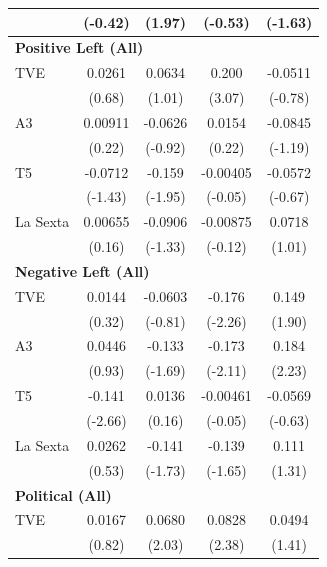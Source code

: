 \documentclass[12pt]{article}
\begin{document}
\begin{table}[htbp]
\begin{tabular}{lcccc}
		& (-0.42)          &  (1.97)          & (-0.53)         & (-1.63)         \\
		\hline
		\multicolumn{5}{l}{\textbf{Positive Left (All)}}\\
				\hline
		TVE            &  0.0261         &  0.0634         &  0.200\sym{**}  & -0.0511         \\
		&  (0.68)         &  (1.01)         &  (3.07)         & (-0.78)         \\
		A3             &  0.00911        & -0.0626         &  0.0154         & -0.0845         \\
		&  (0.22)         & (-0.92)         &  (0.22)         & (-1.19)         \\
		T5             & -0.0712         & -0.159          & -0.00405        & -0.0572         \\
		& (-1.43)         & (-1.95)         & (-0.05)         & (-0.67)         \\
		La Sexta       &  0.00655        & -0.0906         & -0.00875        &  0.0718         \\
		&  (0.16)         & (-1.33)         & (-0.12)         &  (1.01)         \\
		\hline
		\multicolumn{5}{l}{\textbf{Negative Left (All)}}\\
				\hline
		TVE            &  0.0144         & -0.0603         & -0.176\sym{*}   &  0.149          \\
		&  (0.32)         & (-0.81)         & (-2.26)         &  (1.90)         \\
		A3             &  0.0446         & -0.133          & -0.173\sym{*}   &  0.184\sym{*}   \\
		&  (0.93)         & (-1.69)         & (-2.11)         &  (2.23)         \\
		T5             & -0.141\sym{**}  &  0.0136         & -0.00461        & -0.0569         \\
		& (-2.66)         &  (0.16)         & (-0.05)         & (-0.63)         \\
		La Sexta       &  0.0262         & -0.141          & -0.139          &  0.111          \\
		&  (0.53)         & (-1.73)         & (-1.65)         &  (1.31)         \\
		\hline
		\multicolumn{5}{l}{\textbf{Political (All)}}\\
				\hline
		TVE            &  0.0167         &  0.0680\sym{*}  &  0.0828\sym{*}  &  0.0494         \\
		&  (0.82)         &  (2.03)         &  (2.38)         &  (1.41)         \\

\end{tabular}
\end{table}
\end{document}
